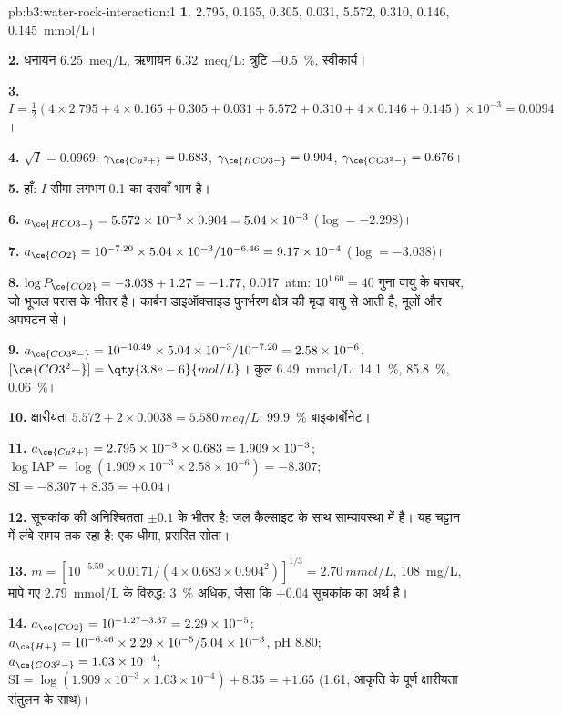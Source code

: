 \begin{solution}{pb:b3:water-rock-interaction:1}
\textbf{1.}  2.795,  0.165,  0.305,  0.031,
 5.572,  0.310,  0.146,  \qty{0.145}{mmol/L}।

\textbf{2.} धनायन \qty{6.25}{meq/L}, ऋणायन \qty{6.32}{meq/L}: त्रुटि
\qty{-0.5}{\percent}, स्वीकार्य।

\textbf{3.} $I = \tfrac12(4\times2.795 + 4\times0.165 + 0.305 + 0.031 + 5.572
+ 0.310 + 4\times0.146 + 0.145)\times10^{-3} = 0.0094$।

\textbf{4.} $\sqrt I = 0.0969$: $\gamma_{\ce{Ca^2+}} = 0.683$,
$\gamma_{\ce{HCO3-}} = 0.904$, $\gamma_{\ce{CO3^2-}} = 0.676$।

\textbf{5.} हाँ: $I$ सीमा लगभग 0.1 का दसवाँ भाग है।

\textbf{6.} $a_{\ce{HCO3-}} = 5.572\times10^{-3}\times0.904 = 5.04\times
10^{-3}$ ($\log = -2.298$)।

\textbf{7.} $a_{\ce{CO2}} = 10^{-7.20}\times5.04\times10^{-3}/10^{-6.46} =
9.17\times10^{-4}$ ($\log = -3.038$)।

\textbf{8.} $\log P_{\ce{CO2}} = -3.038 + 1.27 = -1.77$, \qty{0.017}{atm}:
$10^{1.60} = 40$ गुना वायु के बराबर, जो भूजल परास के भीतर है। कार्बन डाइऑक्साइड
पुनर्भरण क्षेत्र की मृदा वायु से आती है, मूलों और अपघटन से।

\textbf{9.} $a_{\ce{CO3^2-}} = 10^{-10.49}\times5.04\times10^{-3}/10^{-7.20}
= 2.58\times10^{-6}$, $[\ce{CO3^2-}] = \qty{3.8e-6}{mol/L}$। कुल
\qty{6.49}{mmol/L}:  \qty{14.1}{\percent}, 
\qty{85.8}{\percent},  \qty{0.06}{\percent}।

\textbf{10.} क्षारीयता $5.572 + 2\times0.0038 = \qty{5.580}{meq/L}$:
\qty{99.9}{\percent} बाइकार्बोनेट।

\textbf{11.} $a_{\ce{Ca^2+}} = 2.795\times10^{-3}\times0.683 = 1.909\times
10^{-3}$; $\log\mathrm{IAP} = \log(1.909\times10^{-3}\times2.58\times10^{-6})
= -8.307$; $\mathrm{SI} = -8.307 + 8.35 = +0.04$।

\textbf{12.} सूचकांक की अनिश्चितता $\pm0.1$ के भीतर है: जल
कैल्साइट के साथ साम्यावस्था में है। यह चट्टान में लंबे समय तक रहा है: एक धीमा, प्रसरित
सोता।

\textbf{13.} $m = [10^{-5.59}\times0.0171/(4\times0.683\times0.904^2)]^{1/3}
= \qty{2.70}{mmol/L}$, \qty{108}{mg/L}, मापे गए \qty{2.79}{mmol/L} के विरुद्ध:
\qty{3}{\percent} अधिक, जैसा कि $+0.04$ सूचकांक का अर्थ है।

\textbf{14.} $a_{\ce{CO2}} = 10^{-1.27 - 3.37} = 2.29\times10^{-5}$;
$a_{\ce{H+}} = 10^{-6.46}\times2.29\times10^{-5}/5.04\times10^{-3}$, pH 8.80;
$a_{\ce{CO3^2-}} = 1.03\times10^{-4}$; $\mathrm{SI} = \log(1.909\times
10^{-3}\times1.03\times10^{-4}) + 8.35 = +1.65$ (1.61, आकृति के पूर्ण
क्षारीयता संतुलन के साथ)।


\end{solution}

